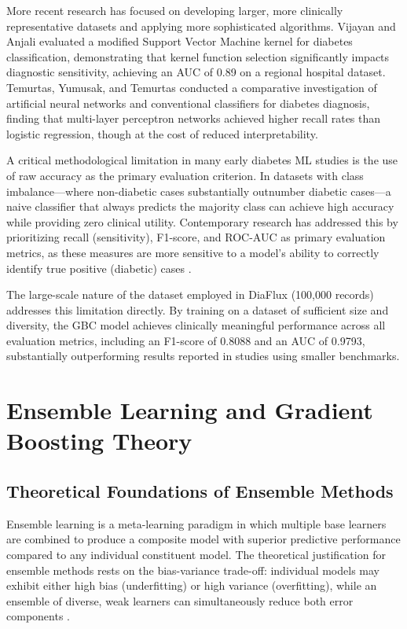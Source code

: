 \documentclass[12pt,a4paper]{report}
\begin{document}
More recent research has focused on developing larger, more clinically representative datasets and applying more sophisticated algorithms. Vijayan and Anjali \cite{vijayan_svm} evaluated a modified Support Vector Machine kernel for diabetes classification, demonstrating that kernel function selection significantly impacts diagnostic sensitivity, achieving an AUC of 0.89 on a regional hospital dataset. Temurtas, Yumusak, and Temurtas \cite{temurtas_ann} conducted a comparative investigation of artificial neural networks and conventional classifiers for diabetes diagnosis, finding that multi-layer perceptron networks achieved higher recall rates than logistic regression, though at the cost of reduced interpretability.

A critical methodological limitation in many early diabetes ML studies is the use of raw accuracy as the primary evaluation criterion. In datasets with class imbalance---where non-diabetic cases substantially outnumber diabetic cases---a naive classifier that always predicts the majority class can achieve high accuracy while providing zero clinical utility. Contemporary research has addressed this by prioritizing recall (sensitivity), F1-score, and ROC-AUC as primary evaluation metrics, as these measures are more sensitive to a model's ability to correctly identify true positive (diabetic) cases \cite{abdar_uncertainty}.

The large-scale nature of the dataset employed in DiaFlux (100,000 records) addresses this limitation directly. By training on a dataset of sufficient size and diversity, the GBC model achieves clinically meaningful performance across all evaluation metrics, including an F1-score of 0.8088 and an AUC of 0.9793, substantially outperforming results reported in studies using smaller benchmarks.

\section{Ensemble Learning and Gradient Boosting Theory}

\subsection{Theoretical Foundations of Ensemble Methods}
Ensemble learning is a meta-learning paradigm in which multiple base learners are combined to produce a composite model with superior predictive performance compared to any individual constituent model. The theoretical justification for ensemble methods rests on the bias-variance trade-off: individual models may exhibit either high bias (underfitting) or high variance (overfitting), while an ensemble of diverse, weak learners can simultaneously reduce both error components \cite{geron_ml}.
\end{document}
